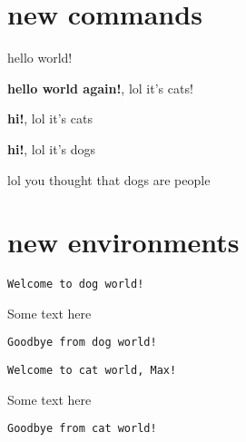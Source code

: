 \documentclass[12pt]{report}
\begin{document}
\section{new commands}

\newcommand{\mycommand}{hello world!} %


\mycommand

\newcommand{\myargumentcommand}[2]{\textbf{#1}, lol it's #2}

\myargumentcommand{hello world again!}{cats!}

\newcommand{\myoptionalcommand}[2][cats]{\textbf{#2}, lol it's #1} %

\myoptionalcommand{hi!}

\myoptionalcommand[dogs]{hi!}

\renewcommand{\textit}[1]{lol you thought that #1}
\textit{dogs are people}

\section{new environments}

\newenvironment{dogworld}{\texttt{Welcome to dog world!}}{\texttt{Goodbye from dog world!}}

\begin{dogworld}

Some text here 

\end{dogworld}

\newenvironment{catworld}[1]{\texttt{Welcome to cat world, #1!}}{\texttt{Goodbye from cat world!}}

\vspace{2em}

\begin{catworld}{Max}

Some text here 

\end{catworld}
\end{document}
